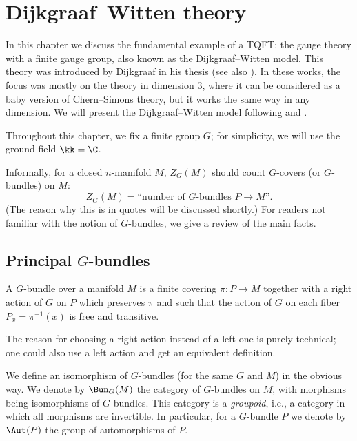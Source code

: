 \chapter{Dijkgraaf--Witten theory}\label{c:DW}
In this chapter we discuss the fundamental example of a TQFT:
the gauge theory with a finite gauge group, also known as the Dijkgraaf--Witten
model. This theory was introduced by Dijkgraaf in his thesis
\cite[Section 8.5]{dijkgraaf-thesis} (see also \cite[Section 6]{DW}). In
these works, the focus was mostly on the theory in dimension 3, where it can be
considered as a baby version of Chern--Simons theory, but it works the same way
in any dimension. We will present the Dijkgraaf--Witten model following
\cite{freed-quinn} and \cite{teleman-five-lectures}.

Throughout this chapter, we fix a finite group $G$; for simplicity, we will
use the ground field $\kk=\C$.

Informally, for a closed $n$-manifold $M$, $Z_G(M)$ should count $G$-covers
(or $G$-bundles) on $M$:
\begin{equation}\label{e:dw-informal}
  Z_G(M)=\text{``number of $G$-bundles $P\to M$''}.
\end{equation}
(The reason why this is in quotes will be discussed shortly.) For readers
not familiar with the notion of $G$-bundles, we give a review of the main
facts.

\section{Principal $G$-bundles}\label{s:principal-bundles}

\begin{definition}\label{d:G-bundle}
  A $G$-bundle over a manifold $M$ is a finite covering $\pi\colon P\to M$
  together with a right action of $G$ on $P$ which preserves $\pi$ and
  such that the action of $G$ on each fiber $P_x=\pi^{-1}(x)$ is free and
  transitive.
\end{definition}
The reason for choosing a right action instead of a left one is purely
technical; one could also use a left action and get an equivalent definition.

We define an isomorphism of $G$-bundles (for the same $G$ and $M$) in the
obvious way. We denote by $\Bun_G(M)$ the category of $G$-bundles on $M$, with
morphisms being isomorphisms of $G$-bundles. This category is a
\emph{groupoid}, i.e., a category in which all morphisms are
invertible. In particular, for a $G$-bundle $P$ we denote by $\Aut(P)$ the group
of automorphisms of $P$.

